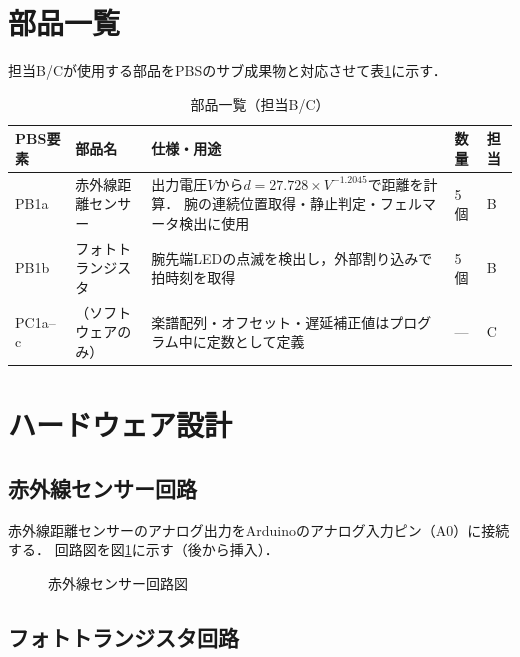 \section{部品一覧}

担当B/Cが使用する部品をPBSのサブ成果物と対応させて表\ref{tab:parts}に示す．

\begin{table}[H]
  \centering
  \begin{tabularx}{\linewidth}{llXll}
    \toprule
    PBS要素 & 部品名 & 仕様・用途 & 数量 & 担当 \\
    \midrule
    PB1a & 赤外線距離センサー &
      出力電圧$V$から$d=27.728 \times V^{-1.2045}$で距離を計算．
      腕の連続位置取得・静止判定・フェルマータ検出に使用 &
      5個 & B \\
    PB1b & フォトトランジスタ &
      腕先端LEDの点滅を検出し，外部割り込みで拍時刻を取得 &
      5個 & B \\
    PC1a--c & （ソフトウェアのみ） &
      楽譜配列・オフセット・遅延補正値はプログラム中に定数として定義 &
      — & C \\
    \bottomrule
  \end{tabularx}
  \caption{部品一覧（担当B/C）}
  \label{tab:parts}
\end{table}

\section{ハードウェア設計}

\subsection*{赤外線センサー回路}

赤外線距離センサーのアナログ出力をArduinoのアナログ入力ピン（A0）に接続する．
回路図を図\ref{fig:circuit-ir}に示す（後から挿入）．

\begin{figure}[H]
  \centering
  \caption{赤外線センサー回路図}
  \label{fig:circuit-ir}
\end{figure}

\subsection*{フォトトランジスタ回路}

